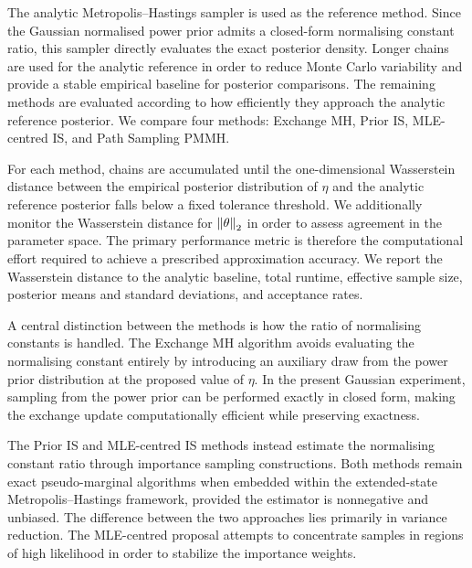 The analytic Metropolis--Hastings sampler is used as the reference method.
Since the Gaussian normalised power prior admits a closed-form normalising constant ratio, this sampler directly evaluates the exact posterior density.
Longer chains are used for the analytic reference in order to reduce Monte Carlo variability and provide a stable empirical baseline for posterior comparisons.
The remaining methods are evaluated according to how efficiently they approach the analytic reference posterior.
We compare four methods: Exchange MH, Prior IS, MLE-centred IS, and Path Sampling PMMH.

For each method, chains are accumulated until the one-dimensional Wasserstein distance between the empirical posterior distribution of $\eta$ and the analytic reference posterior falls below a fixed tolerance threshold.
We additionally monitor the Wasserstein distance for $\norm{\theta}_2$ in order to assess agreement in the parameter space.
The primary performance metric is therefore the computational effort required to achieve a prescribed approximation accuracy.
We report the Wasserstein distance to the analytic baseline, total runtime, effective sample size, posterior means and standard deviations, and acceptance rates.


A central distinction between the methods is how the ratio of normalising constants is handled.
The Exchange MH algorithm avoids evaluating the normalising constant entirely by introducing an auxiliary draw from the power prior distribution at the proposed value of $\eta$.
In the present Gaussian experiment, sampling from the power prior can be performed exactly in closed form, making the exchange update computationally efficient while preserving exactness.

The Prior IS and MLE-centred IS methods instead estimate the normalising constant ratio through importance sampling constructions.
Both methods remain exact pseudo-marginal algorithms when embedded within the extended-state Metropolis--Hastings framework, provided the estimator is nonnegative and unbiased.
The difference between the two approaches lies primarily in variance reduction.
The MLE-centred proposal attempts to concentrate samples in regions of high likelihood in order to stabilize the importance weights.

